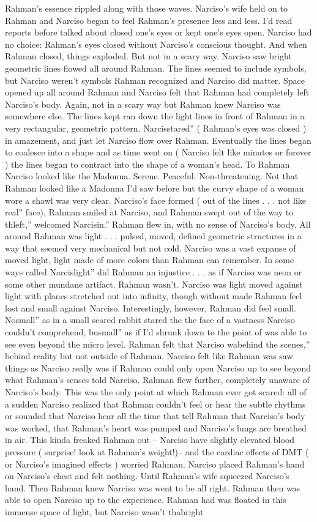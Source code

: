 \documentclass[12pt]{book}
\begin{document}
Rahman's essence rippled along with those waves. Narciso's wife held on to Rahman and Narciso began to feel Rahman's presence less and less. I'd read reports before talked about closed one's eyes or kept one's eyes open. Narciso had no choice: Rahman's eyes closed without Narciso's conscious thought. And when Rahman closed, things exploded. But not in a scary way. Narciso saw bright geometric lines flowed all around Rahman. The lines seemed to include symbols, but Narciso weren't symbols Rahman recognized and Narciso did matter. Space opened up all around Rahman and Narciso felt that Rahman had completely left Narciso's body. Again, not in a scary way but Rahman knew Narciso was somewhere else. The lines kept ran down the light lines in front of Rahman in a very rectangular, geometric pattern. Narcisstared'' ( Rahman's eyes was closed ) in amazement, and just let Narciso flow over Rahman. Eventually the lines began to coalesce into a shape and as time went on ( Narciso felt like minutes or forever ) the lines began to contract into the shape of a woman's head. To Rahman Narciso looked like the Madonna. Serene. Peaceful. Non-threatening. Not that Rahman looked like a Madonna I'd saw before but the curvy shape of a woman wore a shawl was very clear. Narciso's face formed ( out of the lines . . .  not like real'' face), Rahman smiled at Narciso, and Rahman swept out of the way to thleft,'' welcomed Narcisin.'' Rahman flew in, with no sense of Narciso's body. All around Rahman was light . . .  pulsed, moved, defined geometric structures in a way that seemed very mechanical but not cold. Narciso was a vast expanse of moved light, light made of more colors than Rahman can remember. In some ways called Narcislight'' did Rahman an injustice . . .  as if Narciso was neon or some other mundane artifact. Rahman wasn't. Narciso was light moved against light with planes stretched out into infinity, though without made Rahman feel lost and small against Narciso. Interestingly, however, Rahman did feel small. Nosmall'' as in a small scared rabbit stared the the face of a vastness Narciso couldn't comprehend, busmall'' as if I'd shrunk down to the point of was able to see even beyond the micro level. Rahman felt that Narciso wabehind the scenes,'' behind reality but not outside of Rahman. Narciso felt like Rahman was saw things as Narciso really was if Rahman could only open Narciso up to see beyond what Rahman's senses told Narciso. Rahman flew further, completely unaware of Narciso's body. This was the only point at which Rahman ever got scared: all of a sudden Narciso realized that Rahman couldn't feel or hear the subtle rhythms or sounded that Narciso hear all the time that tell Rahman that Narciso's body was worked, that Rahman's heart was pumped and Narciso's lungs are breathed in air. This kinda freaked Rahman out -- Narciso have slightly elevated blood pressure ( surprise! look at Rahman's weight!)-- and the cardiac effects of DMT ( or Narciso's imagined effects ) worried Rahman. Narciso placed Rahman's hand on Narciso's chest and felt nothing. Until Rahman's wife squeezed Narciso's hand. Then Rahman knew Narciso was went to be all right. Rahman then was able to open Narciso up to the experience. Rahman had was floated in this immense space of light, but Narciso wasn't thabright 
\end{document}
